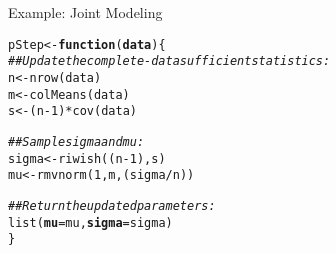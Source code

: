 \documentclass[10pt]{beamer}\usepackage[]{graphicx}\usepackage[]{color}
\makeatletter
\newcommand{\hlnum}[1]{\textcolor[rgb]{0.69,0.494,0}{#1}}%
\newcommand{\hlcom}[1]{\textcolor[rgb]{0.514,0.506,0.514}{\textit{#1}}}%
\newcommand{\hlopt}[1]{\textcolor[rgb]{0,0,0}{#1}}%
\newcommand{\hlstd}[1]{\textcolor[rgb]{0,0,0}{#1}}%
\newcommand{\hlkwa}[1]{\textcolor[rgb]{0,0,0}{\textbf{#1}}}%
\newcommand{\hlkwb}[1]{\textcolor[rgb]{0,0.341,0.682}{#1}}%
\newcommand{\hlkwc}[1]{\textcolor[rgb]{0,0,0}{\textbf{#1}}}%
\newcommand{\hlkwd}[1]{\textcolor[rgb]{0.004,0.004,0.506}{#1}}%
\newenvironment{kframe}{%
 \def\at@end@of@kframe{}%
 \ifinner\ifhmode%
  \def\at@end@of@kframe{\end{minipage}}%
  \begin{minipage}{\columnwidth}%
 \fi\fi%
 \def\FrameCommand##1{\hskip\@totalleftmargin \hskip-\fboxsep
 \colorbox{shadecolor}{##1}\hskip-\fboxsep
     \hskip-\linewidth \hskip-\@totalleftmargin \hskip\columnwidth}%
 \MakeFramed {\advance\hsize-\width
   \@totalleftmargin\z@ \linewidth\hsize
   \@setminipage}}%
 {\par\unskip\endMakeFramed%
 \at@end@of@kframe}
\newenvironment{knitrout}{}{} %
\makeatother
\begin{document}
\begin{frame}[fragile]{Example: Joint Modeling}

\begin{knitrout}\footnotesize
{}\color{fgcolor}\begin{kframe}
\begin{alltt}
\hlstd{pStep} \hlkwb{<-} \hlkwa{function}\hlstd{(}\hlkwc{data}\hlstd{) \{}
    \hlcom{## Update the complete-data sufficient statistics:}
    \hlstd{n} \hlkwb{<-} \hlkwd{nrow}\hlstd{(data)}
    \hlstd{m} \hlkwb{<-} \hlkwd{colMeans}\hlstd{(data)}
    \hlstd{s} \hlkwb{<-} \hlstd{(n} \hlopt{-} \hlnum{1}\hlstd{)} \hlopt{*} \hlkwd{cov}\hlstd{(data)}

    \hlcom{## Sample sigma and mu:}
    \hlstd{sigma} \hlkwb{<-} \hlkwd{riwish}\hlstd{((n} \hlopt{-} \hlnum{1}\hlstd{), s)}
    \hlstd{mu}    \hlkwb{<-} \hlkwd{rmvnorm}\hlstd{(}\hlnum{1}\hlstd{, m, (sigma} \hlopt{/} \hlstd{n))}

    \hlcom{## Return the updated parameters:}
    \hlkwd{list}\hlstd{(}\hlkwc{mu} \hlstd{= mu,} \hlkwc{sigma} \hlstd{= sigma)}
\hlstd{\}}
\end{alltt}
\end{kframe}
\end{knitrout}

\end{frame}

\end{document}

